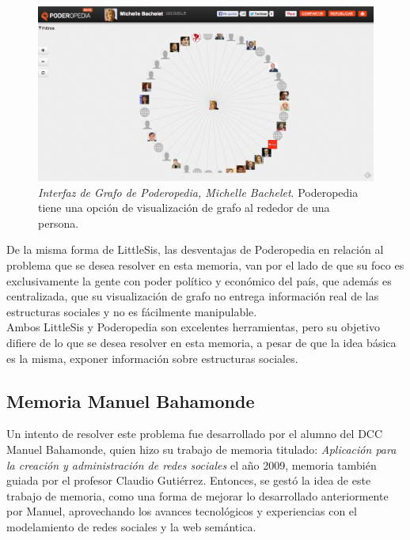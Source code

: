 \begin{figure}[H]
  \includegraphics[width=1.0\textwidth]{images/grafo_poderopedia.png}
  \caption[Interfaz de Grafo de Poderopedia, Michelle Bachelet]{\emph{Interfaz de Grafo de Poderopedia, Michelle Bachelet}. Poderopedia tiene una opción de visualización de grafo al rededor de una persona.}
  \label{ejemplo_grafo_poderopedia}
\end{figure}

De la misma forma de LittleSis, las desventajas de Poderopedia en relación al problema que se desea resolver en esta memoria, van por el lado de que su foco es exclusivamente la gente con poder político y económico del país, que además es centralizada, que su visualización de grafo no entrega información real de las estructuras sociales y no es fácilmente manipulable.\\

Ambos LittleSis y Poderopedia son excelentes herramientas, pero su objetivo difiere de lo que se desea resolver en esta memoria, a pesar de que la idea básica es la misma, exponer información sobre estructuras sociales.


\subsection{Memoria Manuel Bahamonde} %
\label{sub:memoria_manuel_bahamonde}

Un intento de resolver este problema fue desarrollado por el alumno del DCC Manuel Bahamonde, quien hizo su trabajo de memoria titulado: \emph{Aplicación para la creación y administración de redes sociales} \cite{memoriamanuel} el año 2009, memoria también guiada por el profesor Claudio Gutiérrez. Entonces, se gestó la idea de este trabajo de memoria, como una forma de mejorar lo desarrollado anteriormente por Manuel, aprovechando los avances tecnológicos y experiencias con el modelamiento de redes sociales y la web semántica.\\

